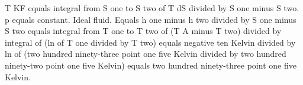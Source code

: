 T KF equals integral from S one to S two of T dS divided by S one minus S two. p equals constant. Ideal fluid. Equals h one minus h two divided by S one minus S two equals integral from T one to T two of (T A minus T two) divided by integral of (ln of T one divided by T two) equals negative ten Kelvin divided by ln of (two hundred ninety-three point one five Kelvin divided by two hundred ninety-two point one five Kelvin) equals two hundred ninety-three point one five Kelvin.